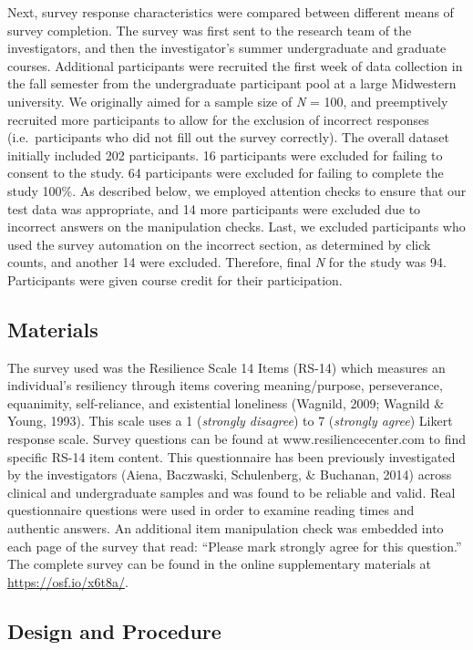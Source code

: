 \documentclass[english,man]{apa6}
\theoremstyle{definition}
\theoremstyle{definition}
\theoremstyle{definition}
\theoremstyle{remark}
\begin{document}
Next, survey response characteristics were compared between different
means of survey completion. The survey was first sent to the research
team of the investigators, and then the investigator's summer
undergraduate and graduate courses. Additional participants were
recruited the first week of data collection in the fall semester from
the undergraduate participant pool at a large Midwestern university. We
originally aimed for a sample size of \emph{N} = 100, and preemptively
recruited more participants to allow for the exclusion of incorrect
responses (i.e.~participants who did not fill out the survey correctly).
The overall dataset initially included 202 participants. 16 participants
were excluded for failing to consent to the study. 64 participants were
excluded for failing to complete the study 100\%. As described below, we
employed attention checks to ensure that our test data was appropriate,
and 14 more participants were excluded due to incorrect answers on the
manipulation checks. Last, we excluded participants who used the survey
automation on the incorrect section, as determined by click counts, and
another 14 were excluded. Therefore, final \emph{N} for the study was
94. Participants were given course credit for their participation.

\subsection{Materials}\label{materials}

The survey used was the Resilience Scale 14 Items (RS-14) which measures
an individual's resiliency through items covering meaning/purpose,
perseverance, equanimity, self-reliance, and existential loneliness
(Wagnild, 2009; Wagnild \& Young, 1993). This scale uses a 1
(\emph{strongly disagree}) to 7 (\emph{strongly agree}) Likert response
scale. Survey questions can be found at www.resiliencecenter.com to find
specific RS-14 item content. This questionnaire has been previously
investigated by the investigators (Aiena, Baczwaski, Schulenberg, \&
Buchanan, 2014) across clinical and undergraduate samples and was found
to be reliable and valid. Real questionnaire questions were used in
order to examine reading times and authentic answers. An additional item
manipulation check was embedded into each page of the survey that read:
\enquote{Please mark strongly agree for this question.} The complete
survey can be found in the online supplementary materials at
\url{https://osf.io/x6t8a/}.

\subsection{Design and Procedure}\label{design-and-procedure}
\end{document}
